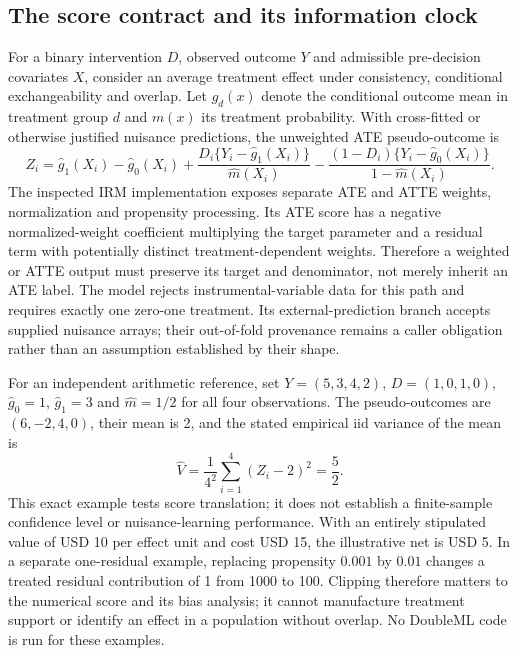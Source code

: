 \subsection{The score contract and its information clock}
\label{exec23:doubleml-reuse-score}
For a binary intervention $D$, observed outcome $Y$ and admissible pre-decision
covariates $X$, consider an average treatment effect under consistency,
conditional exchangeability and overlap. Let $g_d(x)$ denote the conditional
outcome mean in treatment group $d$ and $m(x)$ its treatment probability.
With cross-fitted or otherwise justified nuisance predictions, the unweighted
ATE pseudo-outcome is
\[
 Z_i=\widehat g_1(X_i)-\widehat g_0(X_i)
 +\frac{D_i\{Y_i-\widehat g_1(X_i)\}}{\widehat m(X_i)}
 -\frac{(1-D_i)\{Y_i-\widehat g_0(X_i)\}}{1-\widehat m(X_i)}.
\]
The inspected IRM implementation exposes separate ATE and ATTE weights,
normalization and propensity processing. Its ATE score has a negative
normalized-weight coefficient multiplying the target parameter and a residual
term with potentially distinct treatment-dependent weights. Therefore a weighted
or ATTE output must preserve its target and denominator, not merely inherit an
ATE label. The model rejects instrumental-variable data for this path and
requires exactly one zero-one treatment. Its external-prediction branch accepts
supplied nuisance arrays; their out-of-fold provenance remains a caller
obligation rather than an assumption established by their shape.
\citep{exec23_doubleml_reuse_source}

For an independent arithmetic reference, set $Y=(5,3,4,2)$,
$D=(1,0,1,0)$, $\widehat g_0=1$, $\widehat g_1=3$ and
$\widehat m=1/2$ for all four observations. The pseudo-outcomes are
$(6,-2,4,0)$, their mean is 2, and the stated empirical iid variance of the
mean is
\[
 \widehat V=\frac{1}{4^2}\sum_{i=1}^{4}(Z_i-2)^2=\frac52.
\]
This exact example tests score translation; it does not establish a
finite-sample confidence level or nuisance-learning performance. With an
entirely stipulated value of USD 10 per effect unit and cost USD 15, the
illustrative net is USD 5. In a separate one-residual example, replacing
propensity $0.001$ by $0.01$ changes a treated residual contribution of 1 from
1000 to 100. Clipping therefore matters to the numerical score and its bias
analysis; it cannot manufacture treatment support or identify an effect in a
population without overlap. No DoubleML code is run for these examples.
\citep{exec23_doubleml_reuse_reference}

